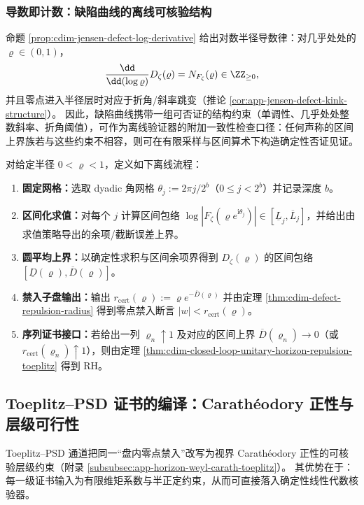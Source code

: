 \subsubsection{导数即计数：缺陷曲线的离线可核验结构}
命题 \ref{prop:cdim-jensen-defect-log-derivative} 给出对数半径导数律：对几乎处处的 \(\varrho\in(0,1)\)，
\[
\frac{\dd}{\dd(\log\varrho)}D_{\zeta}(\varrho)=N_{F_{\zeta}}(\varrho)\in\ZZ_{\ge 0},
\]
并且零点进入半径层时对应于折角/斜率跳变（推论 \ref{cor:app-jensen-defect-kink-structure}）。
因此，缺陷曲线携带一组可否证的结构约束（单调性、几乎处处整数斜率、折角阈值），可作为离线验证器的附加一致性检查口径：任何声称的区间上界族若与这些约束不相容，则可在有限采样与区间算术下构造确定性否证见证。

\begin{algorithm}\label{alg:cdim-jensen-defect-certificate-compiler}
对给定半径 \(0<\varrho<1\)，定义如下离线流程：
\begin{enumerate}
  \item \textbf{固定网格：}选取 dyadic 角网格 \(\theta_j:=2\pi j/2^b\)（\(0\le j<2^b\)）并记录深度 \(b\)。
  \item \textbf{区间化求值：}对每个 \(j\) 计算区间包络
  \(
  \log|F_{\zeta}(\varrho e^{\mathrm{i}\theta_j})|\in[\underline L_j,\overline L_j]
  \)，并给出由求值策略导出的余项/截断误差上界。
  \item \textbf{圆平均上界：}以确定性求积与区间余项界得到 \(D_{\zeta}(\varrho)\) 的区间包络 \([\underline D(\varrho),\overline D(\varrho)]\)。
  \item \textbf{禁入子盘输出：}输出
  \(
  r_{\mathrm{cert}}(\varrho):=\varrho e^{-\overline D(\varrho)}
  \)
  并由定理 \ref{thm:cdim-defect-repulsion-radius} 得到零点禁入断言 \(|w|<r_{\mathrm{cert}}(\varrho)\)。
  \item \textbf{序列证书接口：}若给出一列 \(\varrho_n\uparrow 1\) 及对应的区间上界 \(\overline D(\varrho_n)\to 0\)（或 \(r_{\mathrm{cert}}(\varrho_n)\uparrow 1\)），则由定理 \ref{thm:cdim-closed-loop-unitary-horizon-repulsion-toeplitz} 得到 RH。
\end{enumerate}
\end{algorithm}

\subsection{Toeplitz--PSD 证书的编译：Carath\'eodory 正性与层级可行性}\label{subsec:cdim-toeplitz-psd-certificate-compilation}
Toeplitz--PSD 通道把同一“盘内零点禁入”改写为视界 Carath\'eodory 正性的可核验层级约束（附录 \ref{subsubsec:app-horizon-weyl-carath-toeplitz}）。
其优势在于：每一级证书输入为有限维矩系数与半正定约束，从而可直接落入确定性线性代数核验器。

